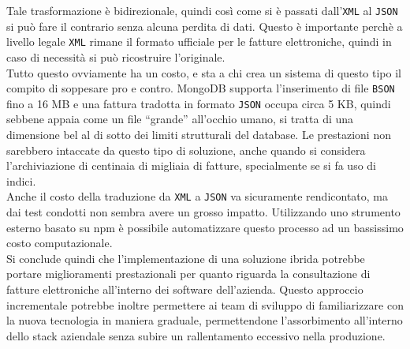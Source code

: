 \noindent Tale trasformazione è bidirezionale, quindi così come si è passati dall'\texttt{XML} al \texttt{JSON} si può fare il contrario senza alcuna perdita di dati. Questo è importante perchè a livello legale \texttt{XML} rimane il formato ufficiale per le fatture elettroniche, quindi in caso di necessità si può ricostruire l'originale.\\

\noindent Tutto questo ovviamente ha un costo, e sta a chi crea un sistema di questo tipo il compito di soppesare pro e contro. MongoDB supporta l'inserimento di file \texttt{BSON} fino a 16 MB e una fattura tradotta in formato \texttt{JSON} occupa circa 5 KB, quindi sebbene appaia come un file ``grande'' all'occhio umano, si tratta di una dimensione bel al di sotto dei limiti strutturali del database. Le prestazioni non sarebbero intaccate da questo tipo di soluzione, anche quando si considera l'archiviazione di centinaia di migliaia di fatture, specialmente se si fa uso di indici.\\
Anche il costo della traduzione da \texttt{XML} a \texttt{JSON} va sicuramente rendicontato, ma dai test condotti non sembra avere un grosso impatto. Utilizzando uno strumento esterno basato su \gls{npm} è possibile automatizzare questo processo ad un bassissimo costo computazionale\cite{site:xml-js}.\\

\noindent Si conclude quindi che l'implementazione di una soluzione ibrida potrebbe portare miglioramenti prestazionali per quanto riguarda la consultazione di fatture elettroniche all'interno dei software dell'azienda. Questo approccio incrementale potrebbe inoltre permettere ai team di sviluppo di familiarizzare con la nuova tecnologia in maniera graduale, permettendone l'assorbimento all'interno dello stack aziendale senza subire un rallentamento eccessivo nella produzione.
